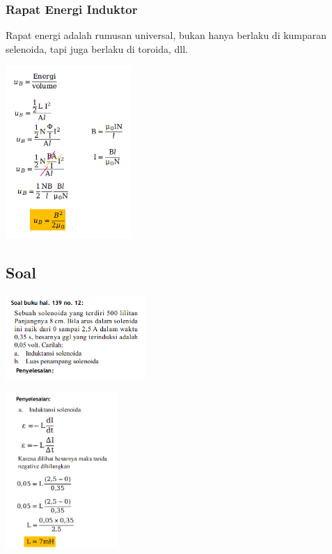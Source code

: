 \documentclass[twocolumn, 11pt]{article}%
\begin{document}
\subsubsection{Rapat Energi Induktor}%
Rapat energi adalah rumusan universal, bukan hanya berlaku di kumparan
selenoida, tapi juga berlaku di toroida, dll.
\begin{center}
    \includegraphics[width=180px]{4.png}
\end{center}

\subsection{Soal}%
\begin{center}
    \includegraphics[width=200px]{5.png}
\end{center}

\begin{center}
    \includegraphics[width=160px]{6.png}
\end{center}
\end{document}
